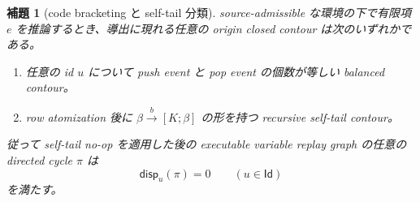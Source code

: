 \documentclass[uplatex,dvipdfmx,a4paper,10.5pt]{jsarticle}
\theoremstyle{jpplain}
\newtheorem{lemma}[definition]{補題}
\newcommand{\Id}{\mathsf{Id}}
\newcommand{\disp}{\mathsf{disp}}
\newcommand{\epedge}[4]{#1\xrightarrow{#2}[#3;#4]}
\begin{document}
\begin{lemma}[code bracketing と self-tail 分類]\label{lem:code-bracketing}
source-admissible な環境の下で有限項 $e$ を推論するとき、導出に現れる任意の origin closed contour は次のいずれかである。
\begin{enumerate}
  \item 任意の id $u$ について push event と pop event の個数が等しい balanced contour。
  \item row atomization 後に $\epedge{\beta}{b}{K}{\beta}$ の形を持つ recursive self-tail contour。
\end{enumerate}
従って self-tail no-op を適用した後の executable variable replay graph の任意の directed cycle $\pi$ は
\[
  \disp_u(\pi)=0\qquad(u\in\Id)
\]
を満たす。
\end{lemma}
\end{document}
